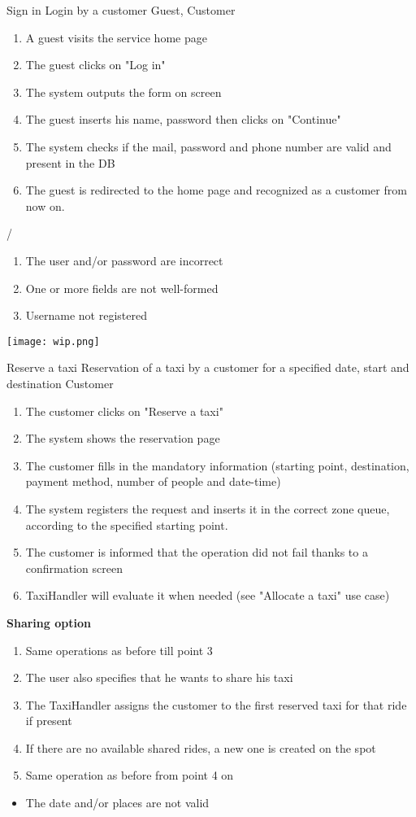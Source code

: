 \usecase
{Sign in}
{Login by a customer}
{Guest, Customer}
{
\begin{enumerate}
	\item A guest visits the service home page
	\item The guest clicks on "Log in"
	\item The system outputs the form on screen
	\item The guest inserts his name, password then clicks on "Continue"
	\item The system checks if the mail, password and phone number are valid and present in the DB
	\item The guest is redirected to the home page and recognized as a customer from now on.
\end{enumerate}
}
{
/
}
{ \begin{enumerate}
	\item The user and/or password are incorrect
	\item One or more fields are not well-formed
	\item Username not registered
\end{enumerate} }

\pagebreak
\texttt{[image: wip.png]}

\usecase
{Reserve a taxi}
{Reservation of a taxi by a customer for a specified date, start and destination}
{Customer}
{
\begin{enumerate}
	\item The customer clicks on "Reserve a taxi"
	\item The system shows the reservation page
	\item The customer fills in the mandatory information (starting point, destination, payment method, number of people and date-time)
	\item The system registers the request and inserts it in the correct zone queue, according to the specified starting point.
	\item The customer is informed that the operation did not fail thanks to a confirmation screen
    \item TaxiHandler will evaluate it when needed (see "Allocate a taxi" use case)
\end{enumerate}
}
{
\textbf{Sharing option}
\begin{enumerate}
	\item Same operations as before till point 3
	\item The user also specifies that he wants to share his taxi
	\item The TaxiHandler assigns the customer to the first reserved taxi for that ride if present
	\item If there are no available shared rides, a new one is created on the spot
	\item Same operation as before from point 4 on
\end{enumerate}
}
{ 
\begin{itemize}
\item The date and/or places are not valid
\end{itemize}
}

